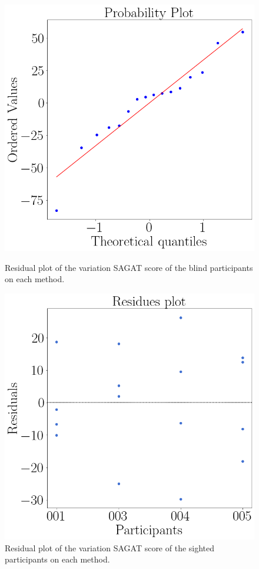 \begin{figure}[!htb]
    \centering
    \begin{minipage}{0.45\textwidth}
        \centering
        \includegraphics[width = 0.8\linewidth]{Resultados/Sagat/Figuras/png/qqplot_sagat_var_sight.png}
        \caption{Residual plot of the variation SAGAT score of the blind participants on each method.}
        \label{fig:qqplot_sagat_var_sight}
    \end{minipage}
    \begin{minipage}{0.45\textwidth}
        \centering
        \includegraphics[width = 0.8\linewidth]{Resultados/Sagat/Figuras/png/residplot_sagat_var_sight.png}
        \caption{Residual plot of the variation SAGAT score of the sighted participants on each method.}
        \label{fig:residplot_sagat_var_sight}
    \end{minipage}
\end{figure}

